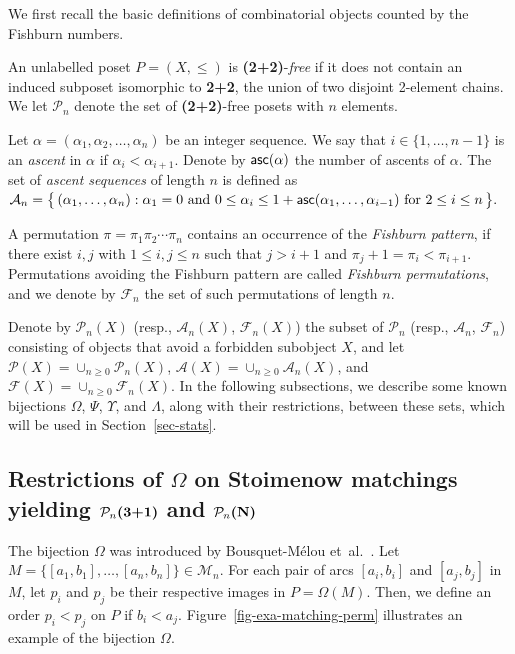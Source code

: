 \documentclass[11pt]{article}
\DeclareMathOperator{\asc}{\mbox{\sf{asc}}}
\newcommand{\etal}{et~al.}
\newcommand{\A}{\mathcal{A}}
\newcommand{\PP}{{\mathcal P}}
\newcommand{\Asc}[1]{\A_{#1}}
\newcommand{\F}{\mathcal{F}}
\newcommand{\M}{\mathcal{M}}
\begin{document}
	We first recall the basic definitions of combinatorial objects counted by the Fishburn numbers.
	
	An unlabelled poset \( P = (X, \le) \) is \textbf{(2+2)}-\emph{free} if it does not contain an induced subposet isomorphic to \textbf{2+2}, the union of two disjoint 2-element chains. We let \( \mathcal{P}_n \) denote the set of \textbf{(2+2)}-free posets with \( n \) elements. 
	
	
	Let \( \alpha = (\alpha_1, \alpha_2, \ldots, \alpha_n) \) be an integer sequence. We say that \( i \in \{1, \ldots, n-1\} \) is an \emph{ascent} in \( \alpha \) if \( \alpha_i < \alpha_{i+1} \).
	Denote by $\asc(\alpha)$ the number of ascents of $\alpha$. 
	The set of \textit{ascent sequences} of length $n$ is defined as
	\(\Asc{n} = \big\{\,(\alpha_1,\ldots , \alpha_n): \alpha_1=0\text{ and } 
	0 \leq \alpha_i \leq 1+\asc(\alpha_1,\ldots , \alpha_{i-1})
	\mbox{ for }2 \leq i\leq n \,\big\}.
	\)
	
	A permutation $\pi=\pi_1\pi_2\cdots\pi_n$ contains an occurrence of the \textit{Fishburn pattern}, if there exist $i,j$ with $1 \le i, j \le n$ such that $j>i+1$ and $\pi_j+1=\pi_i<\pi_{i+1}$. Permutations avoiding the Fishburn pattern are called \emph{Fishburn permutations}, and we denote by $\mathcal{F}_n$ the set of such permutations of length $n$.
	
	Denote by $\mathcal{P}_n(X)$ (resp., $\mathcal{A}_n(X)$, $\mathcal{F}_n(X)$) the subset of $\mathcal{P}_n$ (resp., $\mathcal{A}_n$, $\mathcal{F}_n$) consisting of objects that avoid a forbidden subobject $X$, and let $\PP(X)=\cup_{n\geq 0}\PP_n(X)$, $\A(X)=\cup_{n\geq 0}\A_n(X)$, and $\F(X)=\cup_{n\geq 0}\F_n(X)$.
	In the following subsections, we describe some known bijections $\Omega$, $\Psi$, $\Upsilon$, and $\Lambda$, along with their restrictions, between these sets, which will be used in Section~\ref{sec-stats}.
	
	\subsection{Restrictions of $\Omega$ on Stoimenow matchings yielding $\mathcal{P}_n\text{{\bf (3+1)}}$ and $\mathcal{P}_n\text{{\bf (N)}}$}\label{subsec-matching-poset}
	
	The bijection $\Omega$ was introduced by Bousquet-M\'elou \etal ~\cite{Bousquet-Claesson-Dukes-Kitaev}.
	Let $M=\{[a_1, b_1], \dots, [a_n, b_n]\} \in \M_n$. For each pair of arcs $[a_i, b_i]$ and $[a_j, b_j]$ in $M$, let $p_i$ and $p_j$ be their respective images in $P=\Omega(M)$. Then, we define an order $p_i < p_j$ on $P$ if
	\(
	b_i < a_j.
	\)
	Figure~\ref{fig-exa-matching-perm} illustrates an example of the bijection $\Omega$.
	
\end{document}

